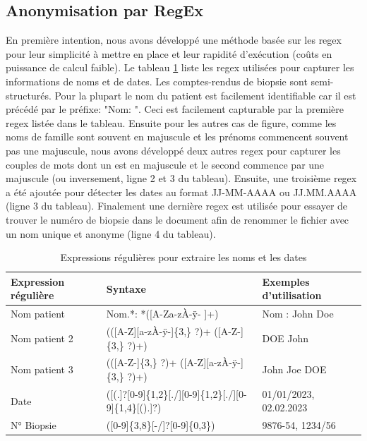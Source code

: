 \subsection{Anonymisation par RegEx}
En première intention, nous avons développé une méthode basée sur les \gls{regex} pour leur simplicité à mettre en place et leur rapidité d'exécution (coûts en puissance de calcul faible). Le tableau \ref{tab:regex} liste les \gls{regex} utilisées pour capturer les informations de noms et de dates. Les comptes-rendus de biopsie sont semi-structurés. Pour la plupart le nom du patient est facilement identifiable car il est précédé par le préfixe: "Nom: ". Ceci est facilement capturable par la première \gls{regex} listée dans le tableau. Ensuite pour les autres cas de figure, comme les noms de famille sont souvent en majuscule et les prénoms commencent souvent pas une majuscule, nous avons développé deux autres \gls{regex} pour capturer les couples de mots dont un est en majuscule et le second commence par une majuscule (ou inversement, ligne 2 et 3 du tableau). 
Ensuite, une troisième \gls{regex} a été ajoutée pour détecter les dates au format JJ-MM-AAAA ou JJ.MM.AAAA (ligne 3 du tableau). Finalement une dernière \gls{regex} est utilisée pour essayer de trouver le numéro de biopsie dans le document afin de renommer le fichier avec un nom unique et anonyme (ligne 4 du tableau). 
\begin{table}[!ht]
\centering
\caption{Expressions régulières pour extraire les noms et les dates}
\label{tab:regex}
\begin{tabular}{|l|l|l|}
\hline
\textbf{Expression régulière} & \textbf{Syntaxe} & \textbf{Exemples d'utilisation} \\ \hline
Nom patient & Nom.*: *([A-Za-zÀ-ÿ- ]+) & Nom : John Doe \\ \hline
Nom patient 2& (([A-Z][a-zÀ-ÿ-]\{3,\} ?)+ ([A-Z-]\{3,\} ?)+) & DOE John \\ \hline
Nom patient 3 & (([A-Z-]\{3,\} ?)+ ([A-Z][a-zÀ-ÿ-]\{3,\} ?)+) & John Joe DOE \\ \hline
Date & ([(.]?[0-9]\{1,2\}[./][0-9]\{1,2\}[./][0-9]\{1,4\}[().]?) & 01/01/2023, 02.02.2023 \\ \hline
N° Biopsie & ([0-9]\{3,8\}[-/]?[0-9]\{0,3\}) & 9876-54, 1234/56 \\ \hline
\end{tabular}
\end{table}

